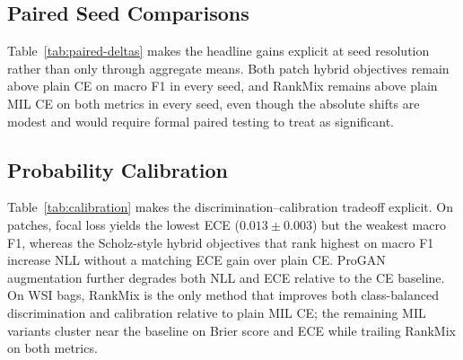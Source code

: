 \documentclass[11pt]{article}
\begin{document}
\subsection{Paired Seed Comparisons}
\begin{table}[htbp]
  \centering
  \caption{Paired test-split differences against the within-regime CE baseline on seeds 0--2. Each cell reports mean $\pm$ SD across seeds; bracketed values list seed-ordered paired deltas. No formal $p$-values are computed.}
  \label{tab:paired-deltas}
  \small
  
\end{table}

Table~\ref{tab:paired-deltas} makes the headline gains explicit at seed resolution rather than only through aggregate means. Both patch hybrid objectives remain above plain CE on macro F1 in every seed, and RankMix remains above plain MIL CE on both metrics in every seed, even though the absolute shifts are modest and would require formal paired testing to treat as significant.

\subsection{Probability Calibration}
\begin{table}[htbp]
  \centering
  \caption{Held-out test calibration metrics over three seeds. Lower is better for negative log likelihood (NLL), multiclass Brier score, and expected calibration error (ECE). Values are not comparable across regimes because patch and WSI-bag models operate on different input units.}
  \label{tab:calibration}
  \small
  
\end{table}

Table~\ref{tab:calibration} makes the discrimination--calibration tradeoff explicit. On patches, focal loss yields the lowest ECE ($0.013 \pm 0.003$) but the weakest macro F1, whereas the Scholz-style hybrid objectives that rank highest on macro F1 increase NLL without a matching ECE gain over plain CE. ProGAN augmentation further degrades both NLL and ECE relative to the CE baseline. On WSI bags, RankMix is the only method that improves both class-balanced discrimination and calibration relative to plain MIL CE; the remaining MIL variants cluster near the baseline on Brier score and ECE while trailing RankMix on both metrics.
\end{document}
